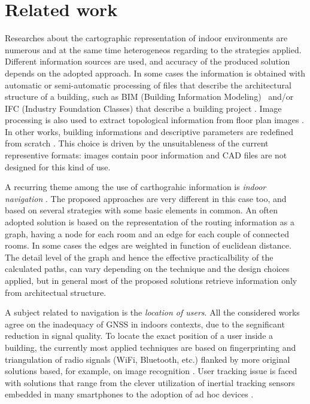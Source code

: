 \section{Related work}\label{related-work}

Researches about the cartographic representation of indoor environments are
numerous and at the same time heterogeneos regarding to the strategies
applied. Different information sources are used, and accuracy of the
produced solution depends on the adopted approach. In some cases the
information is obtained with automatic or semi-automatic processing of files
that describe the architectural structure of a building, such as BIM (Building Information Modeling)~\cite{Eastman:2008:BHG:1796500} and/or IFC (Industry Foundation Classes) that describe a building project \cite{6816739}. Image processing is also used to
extract topological information from floor plan images \cite{6878152}. In
other works, building informations and descriptive parameters are redefined
from scratch \cite{6418876}. This choice is driven by the unsuitableness of
the current representive formats: images contain poor information and CAD
files are not designed for this kind of use. 

A recurring theme among the use
of carthograhic information is \emph{indoor navigation}
\cite{6878152,6418876,6816739}. The proposed approaches are very different in
this case too, and based on several strategies with some basic elements in
common. An often adopted solution is based on the representation of the
routing information as a graph, having a node for each room and an edge for
each couple of connected rooms. In some cases the edges are weighted in
function of euclidean distance. The detail level of the graph and hence the
effective practicalbility of the calculated paths, can vary depending on the
technique and the design choices applied, but in general most of the proposed
solutions retrieve information only from architectual structure. 

A subject related to navigation is the \emph{location of users}. All the considered works
agree on the inadequacy of GNSS in indoors contexts, due to the segnificant
reduction in signal quality. To locate the exact position of a user inside a
building, the currently most applied techniques are based on fingerprinting and
triangulation of radio signals (WiFi, Bluetooth, etc.) flanked by more
original solutions based, for example, on image recognition \cite{6815564}.
User tracking issue is faced with solutions that range from the clever
utilization of inertial tracking sensors embedded in many smartphones
\cite{6815564} to the adoption of ad hoc devices \cite{6878152}.

